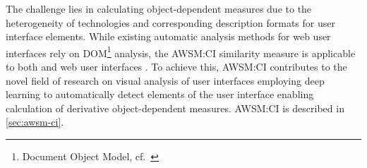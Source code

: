 The challenge lies in calculating object-dependent measures due to the heterogeneity of technologies and corresponding description formats for user interface elements.
While existing automatic analysis methods for \gls{web} user interfaces rely on DOM\footnote{Document Object Model, cf.~\autocite{W3C2015DOM}} analysis, the AWSM:CI similarity measure is applicable to both  and \gls{web} user interfaces \autocite{Heil2016Similarity}.
To achieve this, AWSM:CI contributes to the novel field of research on visual analysis of user interfaces employing deep learning to automatically detect elements of the user interface enabling calculation of derivative object-dependent measures.
AWSM:CI is described in \cref{sec:awsm-ci}.


